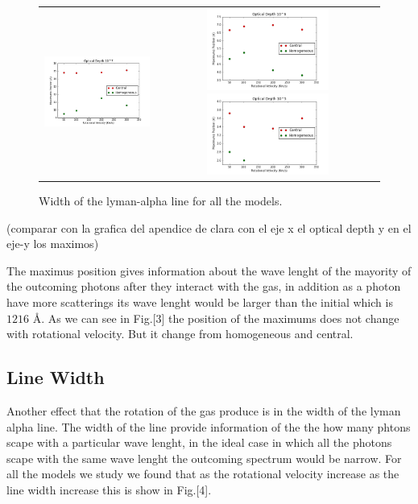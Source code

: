 \documentclass{article}
\theoremstyle{definition}
\theoremstyle{remark}
\begin{document}
\begin{figure}[H]

  \centering

  \label{figur}\caption{Width of the lyman-alpha line for all the models. }

  \begin{tabular}{cc}

    
    \includegraphics[width=40mm]{0maximum7t.png}&

    \includegraphics[width=40mm]{0maximum6t.png}

    \includegraphics[width=40mm]{0maximum5t.png}

   \end{tabular}

\end{figure}
(comparar con la grafica del apendice de clara con el eje x el optical
depth y en el eje-y los maximos) 

The maximus position gives information about the wave lenght of the
mayority of the outcoming photons after they interact with the gas, in
addition as a photon have more scatterings its wave lenght would be
larger than the initial which is $1216$ {\AA}. 
As we can see in Fig.[3] the position of the maximums does not change
with rotational velocity. But it change from homogeneous and central.  

\subsection*{Line Width}

Another effect that the rotation of the gas produce is in the  width
of the lyman alpha line. The width of the line provide information of
the the how many phtons scape with a particular wave lenght, in the
ideal case in which all the photons scape with the same wave lenght
the outcoming spectrum would be narrow. For all the models we study we
found that as the rotational velocity increase as the line width
increase this is show in Fig.[4].\\ 
 
\end{document}
